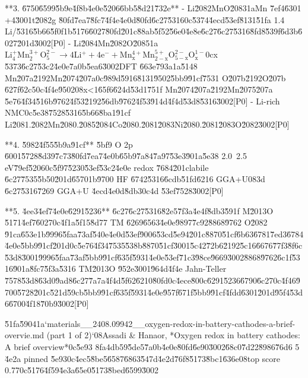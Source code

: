 \documentclass[10pt]{article}
\begin{document}
\begin{AnswerText}
**3. \u6750\u6599\u5b9e\u4f8b\u4e0e\u5206\u6bb5\u8d21\u732e**
- Li\u2082MnO\u2083\uff1aMn \u7ef4\u6301 +4\u3001t\u2082g \u80fd\u7ea7\u8fc7\u4f4e\u4e0d\u80fd\u6c27\u5316\uff0c\u5374\u4ecd\u53ef\u8131\u51fa 1.4 Li/\u5316\u5b66\u5f0f\uff1b\u5176\u6027\u80fd\u201c\u88ab\u5f52\u56e0\u4e8e\u6c27\u6c27\u5316\u8fd8\u539f\u6d3b\u6027\u201d\u3002[P0]
- Li\u2084Mn\u2082O\u2085\uff1a$\mathrm{Li_4^+Mn_2^{3+}O_5^{2-} \to 4Li^+ + 4e^- + Mn_x^{4+}Mn_{2-x}^{5+}O_{5-x}^{2-}O_x^{1-}}$\uff0cx \u5373\u6c27\u53c2\u4e0e\u7a0b\u5ea6\u3002DFT \u663e\u793a\uff1a\u5148 Mn\u207a\u2192Mn\u2074\u207a\uff0c\u989d\u5916\u8131\u9502\u5bb9\u91cf\u7531 O\u207b\u2192O\u207b \u627f\u62c5\uff0c\u4f4e\u9502\uff08x<1\u65f6\u624d\u53d1\u751f Mn\u2074\u207a\u2192Mn\u2075\u207a \u5e76\u4f34\u516b\u9762\u4f53\u2192\u56db\u9762\u4f53\u914d\u4f4d\u53d8\u5316\u3002[P0]
- Li-rich NMC\uff0c\u5e38\u7528\u5316\u5b66\u8ba1\u91cf Li\u2081.\u2082Mn\u2080.\u2085\u2084Co\u2080.\u2081\u2083Ni\u2080.\u2081\u2083O\u2082\u3002[P0]

**4. \u5982\u4f55\u5b9a\u91cf**
\u5bf9 O 2p \u6001\u5728\u8d39\u7c73\u80fd\u7ea7\u4e0b\u65b9\u7a84\u7a97\u53e3\u901a\u5e38 2.0~2.5 eV\u79ef\u5206\uff0c\u5f97\u5230\u53ef\u53c2\u4e0e redox \u7684\u201clabile \u6c27\u7535\u5b50\u201d\u6570\uff1b\u9700 HF \u6742\u5316\u6cdb\u51fd\u6216 GGA+U\uff083d \u6c27\u5316\u7269 GGA+U \u4ecd\u4e0d\u8db3\uff0c4d \u53ef\u7528\u3002[P0]

**5. \u4ee3\u4ef7\u4e0e\u6291\u5236**
\u6c27\u6c27\u5316\u82e5\u7f3a\u4e4f\u8db3\u591f M\u2013O \u5171\u4ef7\u6027\uff0c\u4f1a\u5f15\u8d77 TM \u6269\u6563\u4e0e\u9897\u7c92\u8868\u9762 O\u2082 \u91ca\u653e\uff1b\u9996\u5faa\u73af\u540e\u4e0d\u53ef\u9006\u53cd\u5e94\u201c\u8870\u51cf\u6b63\u6781\u7ed3\u6784\u4e0e\u5bb9\u91cf\u201d\uff0c\u5e76\u4f34\u7535\u538b\u8870\u51cf\u3001\u5c42\u72b6\u2192\u5c16\u6676\u77f3\u8f6c\u53d8\u3001\u9996\u5faa\u73af\u5bb9\u91cf\u635f\u5931\u4e0e\u53ef\u71c3\u98ce\u9669\u3002\u8868\u9762\u6c1f\u5316\u901a\u8fc7\u5f3a\u5316 TM\u2013O \u952e\u3001\u964d\u4f4e Jahn-Teller \u7578\u53d8\u63d0\u9ad8\u6c27\u7a7a\u4f4d\u5f62\u6210\u80fd\uff0c\u4ece\u800c\u6291\u5236\u6790\u6c27\uff0c\u4f46\u9700\u5728\u201c\u521d\u59cb\u5bb9\u91cf\u635f\u5931\u4e0e\u957f\u671f\u5bb9\u91cf\u4fdd\u6301\u201d\u95f4\u53d6\u6700\u4f18\u70b9\u3002[P0]

\u51fa\u5904\uff1a`materials__2408.09942__oxygen-redox-in-battery-cathodes-a-brief-overvie.md (part 1 of 2)`\uff08Assadi & Hanaor, *Oxygen redox in battery cathodes: A brief overview*\uff0c\u5e93 8fa4db59\u5de5\u7a0b\u4e0e\u80fd\u6e90\u3002\u68c0\u7d22\u8986\u76d6 5 \u4e2a pinned \u5e93\uff0c\u4ec5\u8be5\u6587\u6863\u547d\u4e2d\u76f8\u5173\u8bc1\u636e\uff08top score 0.77\uff0c\u5176\u4f59\u4e3a\u65e0\u5173\u8bed\u6599\u3002
\end{AnswerText}
\end{document}
